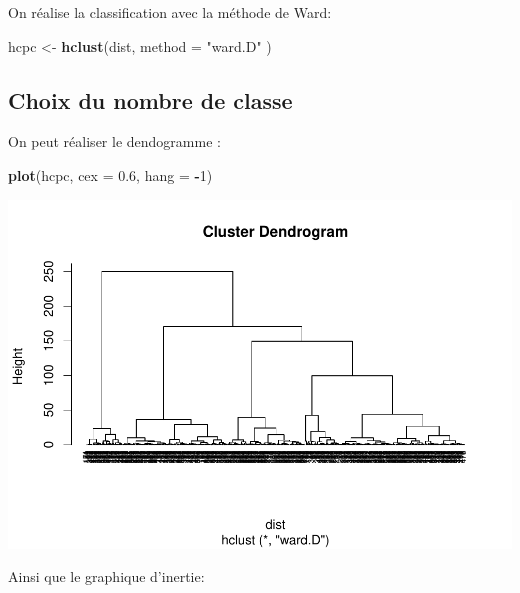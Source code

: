 \documentclass[
]{book}
\newenvironment{Shaded}{\begin{snugshade}}{\end{snugshade}}
\newcommand{\AttributeTok}[1]{\textcolor[rgb]{0.13,0.29,0.53}{#1}}
\newcommand{\ConstantTok}[1]{\textcolor[rgb]{0.56,0.35,0.01}{#1}}
\newcommand{\DecValTok}[1]{\textcolor[rgb]{0.00,0.00,0.81}{#1}}
\newcommand{\FloatTok}[1]{\textcolor[rgb]{0.00,0.00,0.81}{#1}}
\newcommand{\FunctionTok}[1]{\textcolor[rgb]{0.13,0.29,0.53}{\textbf{#1}}}
\newcommand{\NormalTok}[1]{#1}
\newcommand{\OtherTok}[1]{\textcolor[rgb]{0.56,0.35,0.01}{#1}}
\newcommand{\SpecialCharTok}[1]{\textcolor[rgb]{0.81,0.36,0.00}{\textbf{#1}}}
\newcommand{\StringTok}[1]{\textcolor[rgb]{0.31,0.60,0.02}{#1}}
\begin{document}
On réalise la classification avec la méthode de Ward:

\begin{Shaded}
\begin{Highlighting}[]
\NormalTok{hcpc }\OtherTok{\textless{}{-}} \FunctionTok{hclust}\NormalTok{(dist, }\AttributeTok{method =} \StringTok{"ward.D"}\NormalTok{ )}
\end{Highlighting}
\end{Shaded}

\hypertarget{choix-du-nombre-de-classe}{%
\subsection{Choix du nombre de classe}\label{choix-du-nombre-de-classe}}

On peut réaliser le dendogramme :

\begin{Shaded}
\begin{Highlighting}[]
\FunctionTok{plot}\NormalTok{(hcpc, }\AttributeTok{cex =} \FloatTok{0.6}\NormalTok{, }\AttributeTok{hang =} \SpecialCharTok{{-}}\DecValTok{1}\NormalTok{)}
\end{Highlighting}
\end{Shaded}

\includegraphics{bookdown-demo_files/figure-latex/unnamed-chunk-95-1.pdf}

Ainsi que le graphique d'inertie:

\begin{Shaded}
\end{Shaded}
\end{document}
